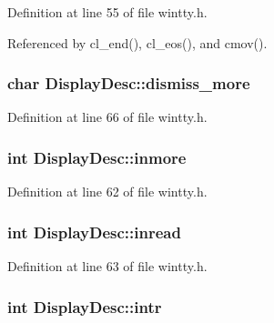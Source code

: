 Definition at line 55 of file wintty.\+h.



Referenced by cl\+\_\+end(), cl\+\_\+eos(), and cmov().

\hypertarget{structDisplayDesc_acb184f2bc093e0c8b9436b469d2ffaf0}{
\subsubsection[{dismiss\+\_\+more}]{\setlength{\rightskip}{0pt plus 5cm}char Display\+Desc\+::dismiss\+\_\+more}}\label{structDisplayDesc_acb184f2bc093e0c8b9436b469d2ffaf0}


Definition at line 66 of file wintty.\+h.

\hypertarget{structDisplayDesc_a81baf7dfae73fa9721aa673039be3880}{
\subsubsection[{inmore}]{\setlength{\rightskip}{0pt plus 5cm}int Display\+Desc\+::inmore}}\label{structDisplayDesc_a81baf7dfae73fa9721aa673039be3880}


Definition at line 62 of file wintty.\+h.

\hypertarget{structDisplayDesc_aea74f9fa5f0342ec323f8e330ce7f1e6}{
\subsubsection[{inread}]{\setlength{\rightskip}{0pt plus 5cm}int Display\+Desc\+::inread}}\label{structDisplayDesc_aea74f9fa5f0342ec323f8e330ce7f1e6}


Definition at line 63 of file wintty.\+h.

\hypertarget{structDisplayDesc_a4511fe2ae3e15fd9175772d266167f92}{
\subsubsection[{intr}]{\setlength{\rightskip}{0pt plus 5cm}int Display\+Desc\+::intr}}\label{structDisplayDesc_a4511fe2ae3e15fd9175772d266167f92}


